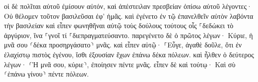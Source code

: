 \documentclass{openreader}
\begin{document}
οἱ δὲ πολῖται αὐτοῦ ἐμίσουν αὐτόν, καὶ ἀπέστειλαν πρεσβείαν ὀπίσω αὐτοῦ λέγοντες· Οὐ θέλομεν τοῦτον βασιλεῦσαι ἐφ’ ἡμᾶς. 
καὶ ἐγένετο ἐν τῷ ἐπανελθεῖν αὐτὸν λαβόντα τὴν βασιλείαν καὶ εἶπεν φωνηθῆναι αὐτῷ τοὺς δούλους τούτους οἷς ⸀δεδώκει τὸ ἀργύριον, ἵνα ⸀γνοῖ τί ⸀διεπραγματεύσαντο. 
παρεγένετο δὲ ὁ πρῶτος λέγων· Κύριε, ἡ μνᾶ σου ⸂δέκα προσηργάσατο⸃ μνᾶς. 
καὶ εἶπεν αὐτῷ· ⸀Εὖγε, ἀγαθὲ δοῦλε, ὅτι ἐν ἐλαχίστῳ πιστὸς ἐγένου, ἴσθι ἐξουσίαν ἔχων ἐπάνω δέκα πόλεων. 
καὶ ἦλθεν ὁ δεύτερος λέγων· ⸂Ἡ μνᾶ σου, κύριε⸃, ἐποίησεν πέντε μνᾶς. 
εἶπεν δὲ καὶ τούτῳ· Καὶ σὺ ⸂ἐπάνω γίνου⸃ πέντε πόλεων. 
\end{document}
